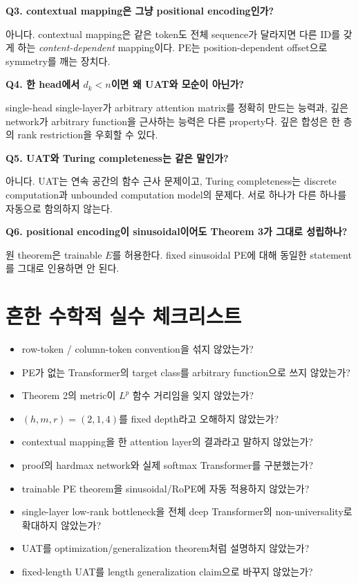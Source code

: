 \documentclass[11pt,a4paper,oneside,openany]{memoir}
\theoremstyle{definition}
\begin{document}
\textbf{Q3. contextual mapping은 그냥 positional encoding인가?}

아니다. contextual mapping은 같은 token도 전체 sequence가 달라지면 다른 ID를 갖게 하는 \emph{content-dependent} mapping이다.
PE는 position-dependent offset으로 symmetry를 깨는 장치다.

\textbf{Q4. 한 head에서 $d_k<n$이면 왜 UAT와 모순이 아닌가?}

single-head single-layer가 arbitrary attention matrix를 정확히 만드는 능력과, 깊은 network가 arbitrary function을 근사하는 능력은 다른 property다.
깊은 합성은 한 층의 rank restriction을 우회할 수 있다.

\textbf{Q5. UAT와 Turing completeness는 같은 말인가?}

아니다. UAT는 연속 공간의 함수 근사 문제이고, Turing completeness는 discrete computation과 unbounded computation model의 문제다.
서로 하나가 다른 하나를 자동으로 함의하지 않는다.

\textbf{Q6. positional encoding이 sinusoidal이어도 Theorem 3가 그대로 성립하나?}

원 theorem은 trainable $E$를 허용한다. fixed sinusoidal PE에 대해 동일한 statement를 그대로 인용하면 안 된다.

\section{흔한 수학적 실수 체크리스트}

\begin{itemize}
  \item row-token / column-token convention을 섞지 않았는가?
  \item PE가 없는 Transformer의 target class를 arbitrary function으로 쓰지 않았는가?
  \item Theorem 2의 metric이 $L^p$ 함수 거리임을 잊지 않았는가?
  \item $(h,m,r)=(2,1,4)$를 fixed depth라고 오해하지 않았는가?
  \item contextual mapping을 한 attention layer의 결과라고 말하지 않았는가?
  \item proof의 hardmax network와 실제 softmax Transformer를 구분했는가?
  \item trainable PE theorem을 sinusoidal/RoPE에 자동 적용하지 않았는가?
  \item single-layer low-rank bottleneck을 전체 deep Transformer의 non-universality로 확대하지 않았는가?
  \item UAT를 optimization/generalization theorem처럼 설명하지 않았는가?
  \item fixed-length UAT를 length generalization claim으로 바꾸지 않았는가?
\end{itemize}
\end{document}
